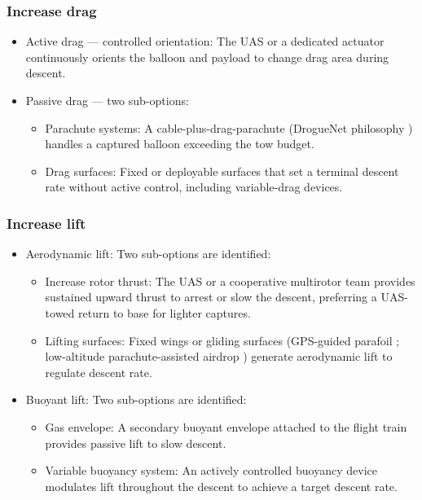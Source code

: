 \subsubsection*{Increase drag}

\begin{itemize}[leftmargin=*]

    \item Active drag — controlled orientation: The UAS or a dedicated actuator continuously orients the balloon and payload to change drag area during descent.

    \item Passive drag — two sub-options:
    \begin{itemize}
        \item Parachute systems: A cable-plus-drag-parachute (DrogueNet philosophy \cite{Fortem}) handles a captured balloon exceeding the tow budget.
        \item Drag surfaces: Fixed or deployable surfaces that set a terminal descent rate without active control, including variable-drag devices.
    \end{itemize}

\end{itemize}
\vspace{-20pt}

\subsubsection*{Increase lift}

\begin{itemize}[leftmargin=*]

    \item Aerodynamic lift: Two sub-options are identified:
    \begin{itemize}
        \item Increase rotor thrust: The UAS or a cooperative multirotor team \cite{Sun2025MLoad} provides sustained upward thrust to arrest or slow the descent, preferring a UAS-towed return to base \cite{DroneCatcher, Fortem} for lighter captures.
        \item Lifting surfaces: Fixed wings or gliding surfaces (GPS-guided parafoil \cite{Slegers2005ModelSystem, Ward2014ParafoilShift}; low-altitude parachute-assisted airdrop \cite{ParaZero}) generate aerodynamic lift to regulate descent rate.
    \end{itemize}

    \item Buoyant lift: Two sub-options are identified:
    \begin{itemize}
        \item Gas envelope: A secondary buoyant envelope attached to the flight train provides passive lift to slow descent.
        \item Variable buoyancy system: An actively controlled buoyancy device modulates lift throughout the descent to achieve a target descent rate.
    \end{itemize}

\end{itemize}


